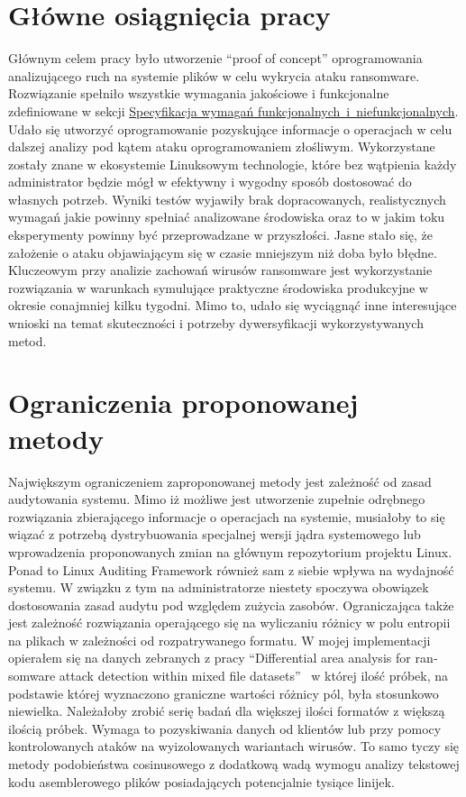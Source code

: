 \section{Główne osiągnięcia pracy}
Głównym celem pracy było utworzenie \foreignquote{english}{proof of concept} oprogramowania analizującego ruch na systemie plików w celu wykrycia ataku ransomware. Rozwiązanie spełniło wszystkie wymagania jakościowe i funkcjonalne zdefiniowane w sekcji \hyperref[sec:wymagania]{Specyfikacja wymagań funkcjonalnych~i~niefunkcjonalnych}. Udało się utworzyć oprogramowanie pozyskujące informacje o operacjach w celu dalszej analizy pod kątem ataku oprogramowaniem złośliwym. Wykorzystane zostały znane w ekosystemie Linuksowym technologie, które bez wątpienia każdy administrator będzie mógł w efektywny i wygodny sposób dostosować do własnych potrzeb.
\newline
Wyniki testów wyjawiły brak dopracowanych, realistycznych wymagań jakie powinny spełniać analizowane środowiska oraz to w jakim toku eksperymenty powinny być przeprowadzane w przyszłości. Jasne stało się, że założenie o ataku objawiającym się w czasie mniejszym niż doba było błędne. Kluczeowym przy analizie zachowań wirusów ransomware jest wykorzystanie rozwiązania w warunkach symulujące praktyczne środowiska produkcyjne w okresie conajmniej kilku tygodni. Mimo to, udało się wyciągnąć inne interesujące wnioski na temat skuteczności i potrzeby dywersyfikacji wykorzystywanych metod. 
\section{Ograniczenia proponowanej metody}
Największym ograniczeniem zaproponowanej metody jest zależność od zasad audytowania systemu. Mimo iż możliwe jest utworzenie zupełnie odrębnego rozwiązania zbierającego informacje o operacjach na systemie, musiałoby to się wiązać z potrzebą dystrybuowania specjalnej wersji jądra systemowego lub wprowadzenia proponowanych zmian na głównym repozytorium projektu Linux. Ponad to Linux Auditing Framework również sam z siebie wpływa na wydajność systemu. W związku z tym na administratorze niestety spoczywa obowiązek dostosowania zasad audytu pod względem zużycia zasobów.
\newpage
Ograniczająca także jest zależność rozwiązania operającego się na wyliczaniu różnicy w polu entropii na plikach w zależności od rozpatrywanego formatu. W mojej implementacji opierałem się na danych zebranych z pracy \foreignquote{english}{Differential area analysis for ransomware attack detection within mixed file datasets}~\cite{davies_differential_2021} w której ilość próbek, na podstawie której wyznaczono graniczne wartości różnicy pól, była stosunkowo niewielka. Należałoby zrobić serię badań dla większej ilości formatów z większą ilością próbek. Wymaga to pozyskiwania danych od klientów lub przy pomocy kontrolowanych ataków na wyizolowanych wariantach wirusów. To samo tyczy się metody podobieństwa cosinusowego z dodatkową wadą wymogu analizy tekstowej kodu asemblerowego plików posiadających potencjalnie tysiące linijek.

